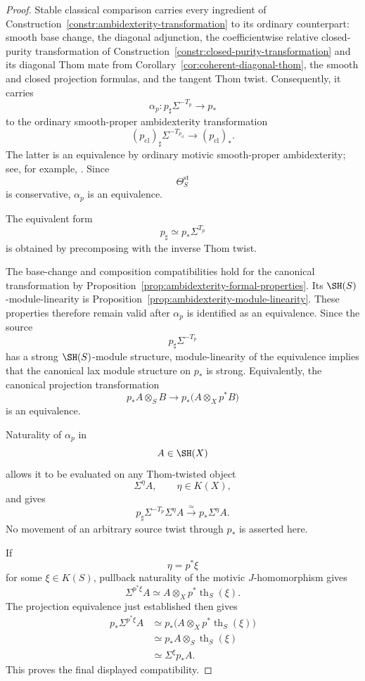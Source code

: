 \begin{proof}
Stable classical comparison carries every ingredient of
Construction~\ref{constr:ambidexterity-transformation} to its ordinary
counterpart: smooth base change, the diagonal adjunction, the
coefficientwise relative closed-purity transformation of
Construction~\ref{constr:closed-purity-transformation} and its diagonal
Thom mate from Corollary~\ref{cor:coherent-diagonal-thom}, the smooth and
closed projection formulas, and the tangent Thom twist.  Consequently, it
carries
\[
    \alpha_p:
    p_\sharp\Sigma^{-T_p}
    \longrightarrow
    p_*
\]
to the ordinary smooth-proper ambidexterity transformation
\[
    (p_{\mathrm{cl}})_\sharp
    \Sigma^{-T_{p_{\mathrm{cl}}}}
    \longrightarrow
    (p_{\mathrm{cl}})_*.
\]
The latter is an equivalence by ordinary motivic smooth-proper
ambidexterity; see, for example,
\cite{HoyoisSixOperations}.  Since
\[
    \Theta_S^{\mathrm{st}}
\]
is conservative, \(\alpha_p\) is an equivalence.

The equivalent form
\[
    p_\sharp
    \simeq
    p_*\Sigma^{T_p}
\]
is obtained by precomposing with the inverse Thom twist.

The base-change and composition compatibilities hold for the canonical
transformation by
Proposition~\ref{prop:ambidexterity-formal-properties}.  Its
\(\SH(S)\)-module-linearity is
Proposition~\ref{prop:ambidexterity-module-linearity}.  These properties
therefore remain valid after \(\alpha_p\) is identified as an equivalence.
Since the source
\[
    p_\sharp\Sigma^{-T_p}
\]
has a strong \(\SH(S)\)-module structure, module-linearity of the
equivalence implies that the canonical lax module structure on \(p_*\) is
strong.  Equivalently, the canonical projection transformation
\[
    p_*A\otimes_SB
    \longrightarrow
    p_*
    \bigl(
      A\otimes_Xp^*B
    \bigr)
\]
is an equivalence.

Naturality of \(\alpha_p\) in
\[
    A\in\SH(X)
\]
allows it to be evaluated on any Thom-twisted object
\[
    \Sigma^\eta A,
    \qquad
    \eta\in K(X),
\]
and gives
\[
    p_\sharp
    \Sigma^{-T_p}
    \Sigma^\eta A
    \xrightarrow{\simeq}
    p_*\Sigma^\eta A.
\]
No movement of an arbitrary source twist through \(p_*\) is asserted here.

If
\[
    \eta=p^*\xi
\]
for some \(\xi\in K(S)\), pullback naturality of the motivic
\(J\)-homomorphism gives
\[
    \Sigma^{p^*\xi}A
    \simeq
    A\otimes_Xp^*\operatorname{th}_S(\xi).
\]
The projection equivalence just established then gives
\[
\begin{aligned}
    p_*\Sigma^{p^*\xi}A
    &\simeq
    p_*
    \bigl(
      A\otimes_Xp^*\operatorname{th}_S(\xi)
    \bigr) \\
    &\simeq
    p_*A\otimes_S\operatorname{th}_S(\xi) \\
    &\simeq
    \Sigma^\xi p_*A.
\end{aligned}
\]
This proves the final displayed compatibility.
\end{proof}

